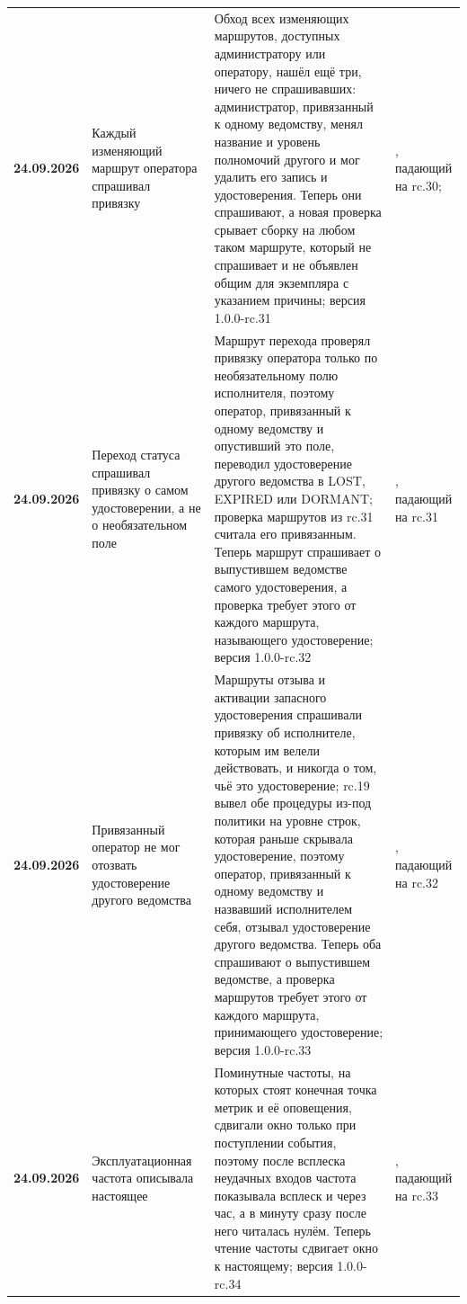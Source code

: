 {\begin{xltabular}{\textwidth}{>{\bfseries\hspace{0pt}}p{0.74in} >{\RaggedRight\arraybackslash\hspace{0pt}}X >{\RaggedRight\arraybackslash\hspace{0pt}}X >{\RaggedRight\arraybackslash\hspace{0pt}}p{1.6in}}
24.09.2026 & Каждый изменяющий маршрут оператора спрашивал привязку & Обход всех изменяющих маршрутов, доступных администратору или оператору, нашёл ещё три, ничего не спрашивавших: администратор, привязанный к одному ведомству, менял название и уровень полномочий другого и мог удалить его запись и удостоверения. Теперь они спрашивают, а новая проверка срывает сборку на любом таком маршруте, который не спрашивает и не объявлен общим для экземпляра с указанием причины; версия 1.0.0-rc.31 & , падающий на rc.30;  \\
24.09.2026 & Переход статуса спрашивал привязку о самом удостоверении, а не о необязательном поле & Маршрут перехода проверял привязку оператора только по необязательному полю исполнителя, поэтому оператор, привязанный к одному ведомству и опустивший это поле, переводил удостоверение другого ведомства в LOST, EXPIRED или DORMANT; проверка маршрутов из rc.31 считала его привязанным. Теперь маршрут спрашивает о выпустившем ведомстве самого удостоверения, а проверка требует этого от каждого маршрута, называющего удостоверение; версия 1.0.0-rc.32 & , падающий на rc.31 \\
24.09.2026 & Привязанный оператор не мог отозвать удостоверение другого ведомства & Маршруты отзыва и активации запасного удостоверения спрашивали привязку об исполнителе, которым им велели действовать, и никогда о том, чьё это удостоверение; rc.19 вывел обе процедуры из-под политики на уровне строк, которая раньше скрывала удостоверение, поэтому оператор, привязанный к одному ведомству и назвавший исполнителем себя, отзывал удостоверение другого ведомства. Теперь оба спрашивают о выпустившем ведомстве, а проверка маршрутов требует этого от каждого маршрута, принимающего удостоверение; версия 1.0.0-rc.33 & , падающий на rc.32 \\
24.09.2026 & Эксплуатационная частота описывала настоящее & Поминутные частоты, на которых стоят конечная точка метрик и её оповещения, сдвигали окно только при поступлении события, поэтому после всплеска неудачных входов частота показывала всплеск и через час, а в минуту сразу после него читалась нулём. Теперь чтение частоты сдвигает окно к настоящему; версия 1.0.0-rc.34 & , падающий на rc.33 \\

\end{xltabular}}
